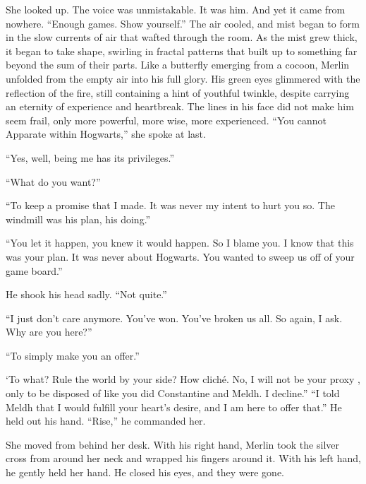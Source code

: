 She looked up. The voice was unmistakable. It was him. And yet it came from nowhere. “Enough games. Show yourself.”
\SmallVSpace
The air cooled, and mist began to form in the slow currents of air that wafted through the room. As the mist grew thick, it began to take shape, swirling in fractal patterns that built up to something far beyond the sum of their parts. Like a butterfly emerging from a cocoon, Merlin unfolded from the empty air into his full glory. His green eyes glimmered with the reflection of the fire, still containing a hint of youthful twinkle, despite carrying an eternity of experience and heartbreak. The lines in his face did not make him seem frail, only more powerful, more wise, more experienced.
\SmallVSpace
“You cannot Apparate within Hogwarts,” she spoke at last.

“Yes, well, being me has its privileges.”

“What do you want?”

“To keep a promise that I made. It was never my intent to hurt you so. The windmill was his plan, his doing.”

“You let it happen, you knew it would happen. So I blame you. I know that this was your plan. It was never about Hogwarts. You wanted to sweep us off of your game board.”

He shook his head sadly. “Not quite.”

“I just don’t care anymore. You’ve won. You’ve broken us all. So again, I ask. Why are you here?”

“To simply make you an offer.”

‘To what? Rule the world by your side? How cliché. No, I will not be your proxy , only to be disposed of like you did Constantine and Meldh. I decline.”
\SmallVSpace
“I told Meldh that I would fulfill your heart’s desire, and I am here to offer that.” He held out his hand. “Rise,” he commanded her.

She moved from behind her desk. With his right hand, Merlin took the silver cross from around her neck and wrapped his fingers around it. With his left hand, he gently held her hand. He closed his eyes, and they were gone.

